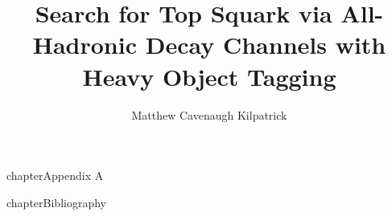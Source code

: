 \documentclass[12pt]{ruthesis}
\title{Search for Top Squark via All-Hadronic Decay Channels with Heavy Object Tagging}
\author{Matthew Cavenaugh Kilpatrick}
\begin{document}
  \begin{frontmatter}
   \maketitle
   
   \tableofcontents
   \listoffigures
   \listoftables
%   
  \end{frontmatter}










\appendix
{} {chapter}{\numberline {}Appendix A}

%
 {chapter}{\numberline {}Bibliography}{}





\end{document}
